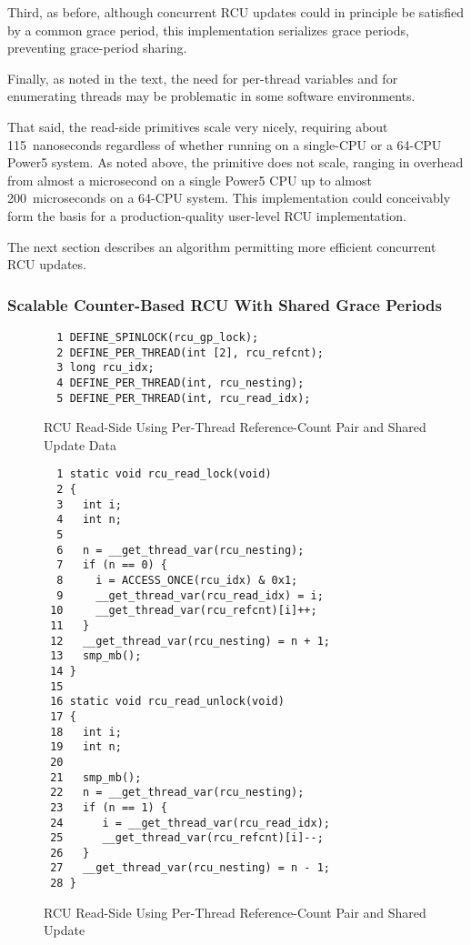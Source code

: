 Third, as before, although concurrent RCU updates could in principle
be satisfied by a common grace period, this implementation serializes
grace periods, preventing grace-period sharing.

Finally, as noted in the text, the need for per-thread variables
and for enumerating threads may be problematic in some software
environments.

That said, the read-side primitives scale very nicely, requiring about
115~nanoseconds regardless of whether running on a single-CPU or a 64-CPU
Power5 system.
As noted above, the  primitive does not scale,
ranging in overhead from almost a microsecond on a single Power5 CPU
up to almost 200~microseconds on a 64-CPU system.
This implementation could conceivably form the basis for a
production-quality user-level RCU implementation.

The next section describes an algorithm permitting more efficient
concurrent RCU updates.

\subsubsection{Scalable Counter-Based RCU With Shared Grace Periods}
\label{defer:Scalable Counter-Based RCU With Shared Grace Periods}

\begin{figure}[tbp]
{ \scriptsize
\begin{verbatim}
  1 DEFINE_SPINLOCK(rcu_gp_lock);
  2 DEFINE_PER_THREAD(int [2], rcu_refcnt);
  3 long rcu_idx;
  4 DEFINE_PER_THREAD(int, rcu_nesting);
  5 DEFINE_PER_THREAD(int, rcu_read_idx);
\end{verbatim}
}
\caption{RCU Read-Side Using Per-Thread Reference-Count Pair and Shared Update Data}
\label{fig:defer:RCU Read-Side Using Per-Thread Reference-Count Pair and Shared Update Data}
\end{figure}

\begin{figure}[tbp]
{ \scriptsize
\begin{verbatim}
  1 static void rcu_read_lock(void)
  2 {
  3   int i;
  4   int n;
  5
  6   n = __get_thread_var(rcu_nesting);
  7   if (n == 0) {
  8     i = ACCESS_ONCE(rcu_idx) & 0x1;
  9     __get_thread_var(rcu_read_idx) = i;
 10     __get_thread_var(rcu_refcnt)[i]++;
 11   }
 12   __get_thread_var(rcu_nesting) = n + 1;
 13   smp_mb();
 14 }
 15
 16 static void rcu_read_unlock(void)
 17 {
 18   int i;
 19   int n;
 20
 21   smp_mb();
 22   n = __get_thread_var(rcu_nesting);
 23   if (n == 1) {
 24      i = __get_thread_var(rcu_read_idx);
 25      __get_thread_var(rcu_refcnt)[i]--;
 26   }
 27   __get_thread_var(rcu_nesting) = n - 1;
 28 }
\end{verbatim}
}
\caption{RCU Read-Side Using Per-Thread Reference-Count Pair and Shared Update}
\label{fig:defer:RCU Read-Side Using Per-Thread Reference-Count Pair and Shared Update}
\end{figure}

